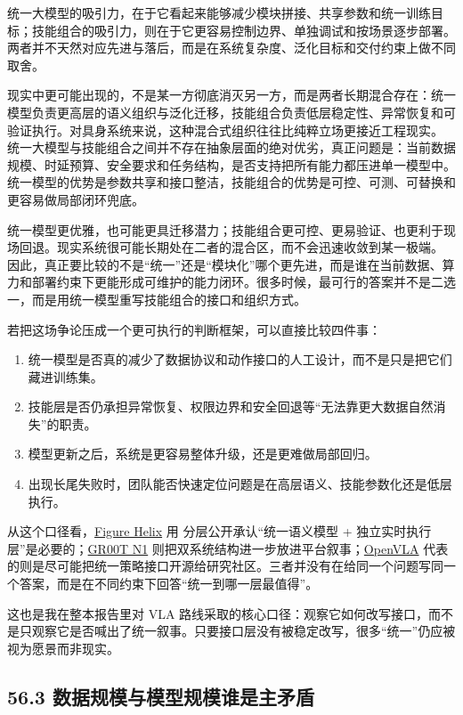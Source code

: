 统一大模型的吸引力，在于它看起来能够减少模块拼接、共享参数和统一训练目标；技能组合的吸引力，则在于它更容易控制边界、单独调试和按场景逐步部署。两者并不天然对应先进与落后，而是在系统复杂度、泛化目标和交付约束上做不同取舍。

现实中更可能出现的，不是某一方彻底消灭另一方，而是两者长期混合存在：统一模型负责更高层的语义组织与泛化迁移，技能组合负责低层稳定性、异常恢复和可验证执行。对具身系统来说，这种混合式组织往往比纯粹立场更接近工程现实。 统一大模型与技能组合之间并不存在抽象层面的绝对优劣，真正问题是：当前数据规模、时延预算、安全要求和任务结构，是否支持把所有能力都压进单一模型中。统一模型的优势是参数共享和接口整洁，技能组合的优势是可控、可测、可替换和更容易做局部闭环兜底。

统一模型更优雅，也可能更具迁移潜力；技能组合更可控、更易验证、也更利于现场回退。现实系统很可能长期处在二者的混合区，而不会迅速收敛到某一极端。 因此，真正要比较的不是“统一”还是“模块化”哪个更先进，而是谁在当前数据、算力和部署约束下更能形成可维护的能力闭环。很多时候，最可行的答案并不是二选一，而是用统一模型重写技能组合的接口和组织方式。

若把这场争论压成一个更可执行的判断框架，可以直接比较四件事：

\begin{enumerate}
\item 统一模型是否真的减少了数据协议和动作接口的人工设计，而不是只是把它们藏进训练集。
\item 技能层是否仍承担异常恢复、权限边界和安全回退等“无法靠更大数据自然消失”的职责。
\item 模型更新之后，系统是更容易整体升级，还是更难做局部回归。
\item 出现长尾失败时，团队能否快速定位问题是在高层语义、技能参数化还是低层执行。
\end{enumerate}

从这个口径看，\href{https://www.figure.ai/news/helix}{Figure Helix} 用  分层公开承认“统一语义模型 + 独立实时执行层”是必要的；\href{https://arxiv.org/abs/2503.14734}{GR00T N1} 则把双系统结构进一步放进平台叙事；\href{https://arxiv.org/abs/2406.09246}{OpenVLA} 代表的则是尽可能把统一策略接口开源给研究社区。三者并没有在给同一个问题写同一个答案，而是在不同约束下回答“统一到哪一层最值得”。

这也是我在整本报告里对 VLA 路线采取的核心口径：观察它如何改写接口，而不是只观察它是否喊出了统一叙事。只要接口层没有被稳定改写，很多“统一”仍应被视为愿景而非现实。

\subsection*{56.3 数据规模与模型规模谁是主矛盾}


